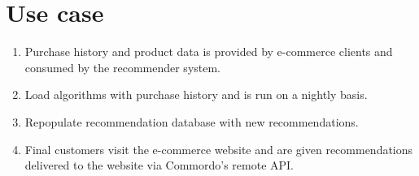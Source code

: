 
\section{Use case}\label{sec:use}

\begin{enumerate}
    \item Purchase history and product data is provided by e-commerce clients and consumed by the recommender system.
    \item Load algorithms with purchase history and is run on a nightly basis.
    \item Repopulate recommendation database with new recommendations.
    \item Final customers visit the e-commerce website and are given recommendations delivered to the website via Commordo's remote API.
\end{enumerate}

